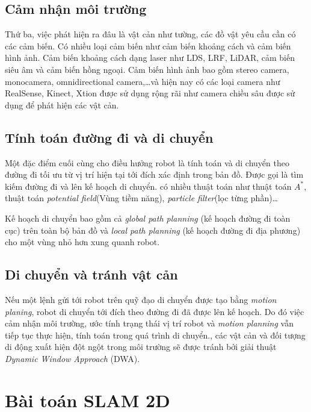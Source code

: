 \subsection*{Cảm nhận môi trường}
Thứ ba, việc phát hiện ra đâu là vật cản như tường, các đồ vật yêu cầu cần có các cảm biến. Có nhiều loại cảm biến như cảm biến khoảng cách và cảm biến hình ảnh. Cảm biến khoảng cách dạng laser như LDS, LRF, LiDAR, cảm biến siêu âm và cảm biến hồng ngoại. Cảm biến hình ảnh bao gồm stereo camera, monocamera, omnidirectional camera,\dots và hiện nay có các loại camera như RealSense, Kinect, Xtion được sử dụng rộng rãi như camera chiều sâu được sử dụng để phát hiện các vật cản.

\subsection*{Tính toán đường đi và di chuyển}
Một đặc điểm cuối cùng cho điều hưởng robot là tính toán và di chuyển theo đường đi tối ưu từ vị trí hiện tại tới đích xác định trong bản đồ. Được gọi là tìm kiếm đường đi và lên kế hoạch di chuyển. có nhiều thuật toán như thuật toán ${A}^{*}$, thuật toán \textit{potential field}(Vùng tiềm năng), \textit{particle filter}(lọc từng phần)\dots

Kế hoạch di chuyển bao gồm cả \textit{global path planning} (kế hoạch đường đi toàn cục) trên toàn bộ bản đồ và \textit{local path planning} (kế hoạch đường đi địa phương) cho một vùng nhỏ hơn xung quanh robot.

\subsection*{Di chuyển và tránh vật cản}
Nếu một lệnh gửi tới robot trên quỹ đạo di chuyển được tạo bằng \textit{motion planing}, robot di chuyển tới đích theo đường đi đã được lên kế hoạch. Do đó việc cảm nhận môi trường, ước tính trạng thái vị trí robot và \textit{motion planning} vẫn tiếp tục thực hiện, tính toán trong quá trình di chuyển., các vật cản và đối tượng di động xuất hiện đột ngột trong môi trường sẽ được tránh bởi giải thuật \textit{Dynamic Window Approach} (DWA).


\section{Bài toán SLAM 2D}


